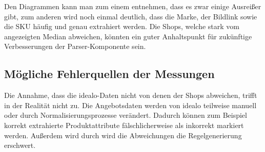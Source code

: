 Den Diagrammen kann man zum einem entnehmen, dass es zwar einige Ausreißer gibt, zum anderen wird noch einmal
deutlich, dass die Marke, der Bildlink sowie die SKU häufig und genau extrahiert werden.
Die Shops, welche stark vom angezeigten Median abweichen, könnten ein guter Anhaltspunkt für zukünftige Verbesserungen
der Parser-Komponente sein.

\subsection{Mögliche Fehlerquellen der Messungen}
\label{subsec:fehlerquellen}

Die Annahme, dass die idealo-Daten nicht von denen der Shops abweichen, trifft in der Realität nicht zu.
Die Angebotsdaten werden von idealo teilweise manuell oder durch Normalisierungsprozesse verändert.
Dadurch können zum Beispiel korrekt extrahierte Produktattribute fälschlicherweise als inkorrekt markiert werden.
Außerdem wird durch wird die Abweichungen die Regelgenerierung erschwert.